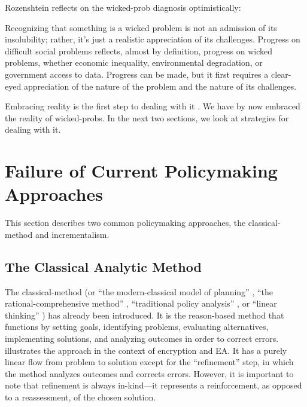 Rozenshtein reflects on the \ac{wicked-prob} diagnosis optimistically:

\begin{displayquote}
Recognizing that something is a wicked problem is not an admission of its insolubility; rather, it’s just a realistic
appreciation of its challenges. Progress on difficult social problems reflects, almost by definition, progress on wicked
problems, whether economic inequality, environmental degradation, or government access to data. Progress can be made,
but it first requires a clear-eyed appreciation of the nature of the problem and the nature of its challenges.
\cite{rozenshtein_wicked_2018}
\end{displayquote}

Embracing reality is the first step to dealing with it \cite{baker_2019}. We have by now embraced the reality of
\acp{wicked-prob}. In the next two sections, we look at strategies for dealing with it.


\section{Failure of Current Policymaking Approaches}

This section describes two common policymaking approaches, the \ac{classical-method} and \ac{incrementalism}.

\subsection{The Classical Analytic Method}

The \ac{classical-method} \cite{feeley_judicial_2000} (or ``the modern-classical model of planning''
\cite{rittel_dilemmas_1973}, ``the rational-comprehensive method'' \cite{lindblom_muddling_1959}, ``traditional policy
analysis'' \cite{rozenshtein_wicked_2018}, or ``linear thinking'' \cite{commission_tackling_2018}) has already been
introduced. It is the reason-based method that functions by setting goals, identifying problems, evaluating
alternatives, implementing solutions, and analyzing outcomes in order to correct errors. 
illustrates the approach in the context of encryption and \ac{EA}. It has a purely linear flow from problem to solution
except for the ``refinement'' step, in which the method analyzes outcomes and corrects errors. However, it is important
to note that refinement is always in-kind---it represents a reinforcement, as opposed to a reassessment, of the chosen
solution.

